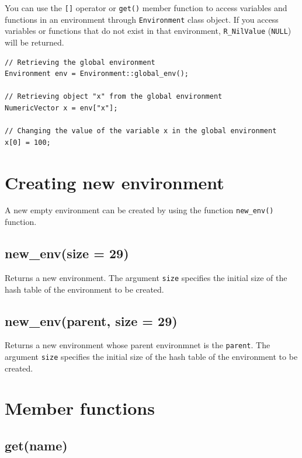 \documentclass[]{book}
\begin{document}
You can use the \texttt{{[}{]}} operator or \texttt{get()} member function to access variables and functions in an environment through \texttt{Environment} class object. If you access variables or functions that do not exist in that environment, \texttt{R\_NilValue} (\texttt{NULL}) will be returned.

\begin{verbatim}
// Retrieving the global environment
Environment env = Environment::global_env();

// Retrieving object "x" from the global environment
NumericVector x = env["x"];

// Changing the value of the variable x in the global environment
x[0] = 100;
\end{verbatim}

\hypertarget{creating-new-environment}{%
\section{Creating new environment}\label{creating-new-environment}}

A new empty environment can be created by using the function \texttt{new\_env()} function.

\hypertarget{new_envsize-29}{%
\subsection{new\_env(size = 29)}\label{new_envsize-29}}

Returns a new environment. The argument \texttt{size} specifies the initial size of the hash table of the environment to be created.

\hypertarget{new_envparent-size-29}{%
\subsection{new\_env(parent, size = 29)}\label{new_envparent-size-29}}

Returns a new environment whose parent environmnet is the \texttt{parent}. The argument \texttt{size} specifies the initial size of the hash table of the environment to be created.

\hypertarget{member-functions-8}{%
\section{Member functions}\label{member-functions-8}}

\hypertarget{getname}{%
\subsection{get(name)}\label{getname}}
\end{document}
